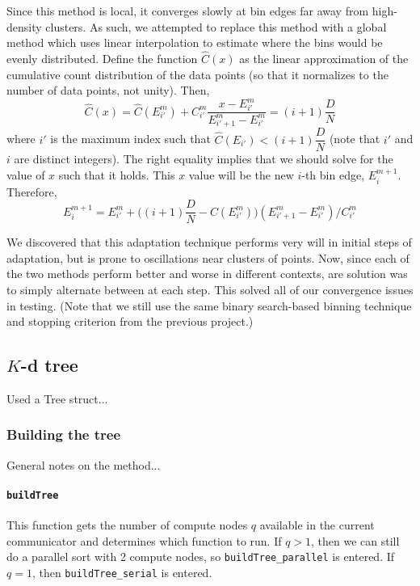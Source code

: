 \documentclass{article}
\begin{document}
Since this method is local, it converges slowly at bin edges far away from high-density clusters. As such, we attempted to replace this method with a global method which uses linear interpolation to estimate where the bins would be evenly distributed. Define the function $\hat C(x)$ as the linear approximation of the cumulative count distribution of the data points (so that it normalizes to the number of data points, not unity). Then,
\begin{equation}
		\hat C(x) = \hat C(E^m_{i'}) + C^m_{i'} \dfrac{x - E^m_{i'}}{E^m_{{i'}+1} - E^m_{i'}} = (i+1) \dfrac{D}{N}
\end{equation}
where $i'$ is the maximum index such that $\hat C(E_{i'}) < (i+1) \dfrac{D}{N}$ (note that $i'$ and $i$ are distinct integers). The right equality implies that we should solve for the value of $x$ such that it holds. This $x$ value will be the new $i$-th bin edge, $E^{m+1}_i$. Therefore,
\begin{equation}
		E^{m+1}_i = E^m_{i'} + \bigg( (i+1) \dfrac{D}{N} - C(E^m_{i'}) \bigg) (E^m_{{i'}+1} - E^m_{i'}) / C^m_{i'}
\end{equation}

We discovered that this adaptation technique performs very will in initial steps of adaptation, but is prone to oscillations near clusters of points. Now, since each of the two methods perform better and worse in different contexts, are solution was to simply alternate between at each step. This solved all of our convergence issues in testing. (Note that we still use the same binary search-based binning technique and stopping criterion from the previous project.)


\subsection{$K$-d tree}
Used a Tree struct...


\subsubsection{Building the tree}
General notes on the method...


\paragraph{\texttt{buildTree}}
This function gets the number of compute nodes $q$ available in the current communicator and determines which function to run. If $q>1$, then we can still do a parallel sort with 2 compute nodes, so \texttt{buildTree\_parallel} is entered. If $q=1$, then \texttt{buildTree\_serial} is entered.
\end{document}
